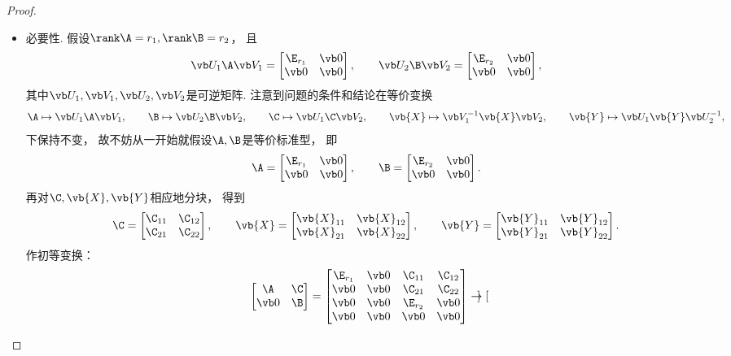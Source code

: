 \begin{example}
\begin{proof}
\begin{itemize}
	\item 必要性.
	假设\(\rank \A=r_1,
	\rank \B=r_2\)，
	且\[
		\P_1 \A \Q_1
		= \begin{bmatrix}
			\E_{r_1} & \vb0 \\
			\vb0 & \vb0
		\end{bmatrix},
		\qquad
		\P_2 \B \Q_2
		= \begin{bmatrix}
			\E_{r_2} & \vb0 \\
			\vb0 & \vb0
		\end{bmatrix},
	\]
	其中\(\P_1,\Q_1,\P_2,\Q_2\)是可逆矩阵.
	注意到问题的条件和结论在等价变换\[
		\A \mapsto \P_1 \A \Q_1, \qquad
		\B \mapsto \P_2 \B \Q_2, \qquad
		\C \mapsto \P_1 \C \Q_2, \qquad
		\vb{X} \mapsto \Q_1^{-1} \vb{X} \Q_2, \qquad
		\vb{Y} \mapsto \P_1 \vb{Y} \P_2^{-1},
	\]下保持不变，
	故不妨从一开始就假设\(\A,\B\)是等价标准型，
	即\[
		\A = \begin{bmatrix}
			\E_{r_1} & \vb0 \\
			\vb0 & \vb0
		\end{bmatrix}, \qquad
		\B = \begin{bmatrix}
			\E_{r_2} & \vb0 \\
			\vb0 & \vb0
		\end{bmatrix}.
	\]
	再对\(\C,\vb{X},\vb{Y}\)相应地分块，
	得到\[
		\C = \begin{bmatrix}
			\C_{11} & \C_{12} \\
			\C_{21} & \C_{22}
		\end{bmatrix},
		\qquad
		\vb{X} = \begin{bmatrix}
			\vb{X}_{11} & \vb{X}_{12} \\
			\vb{X}_{21} & \vb{X}_{22}
		\end{bmatrix},
		\qquad
		\vb{Y} = \begin{bmatrix}
			\vb{Y}_{11} & \vb{Y}_{12} \\
			\vb{Y}_{21} & \vb{Y}_{22}
		\end{bmatrix}.
	\]
	作初等变换：\[
		\begin{bmatrix}
			\A & \C \\
			\vb0 & \B
		\end{bmatrix}
		= \begin{bmatrix}
			\E_{r_1} & \vb0 & \C_{11} & \C_{12} \\
			\vb0 & \vb0 & \C_{21} & \C_{22} \\
			\vb0 & \vb0 & \E_{r_2} & \vb0 \\
			\vb0 & \vb0 & \vb0 & \vb0
		\end{bmatrix}
		\to \begin{bmatrix}

\end{bmatrix}\]
\end{itemize}
\end{proof}
\end{example}
